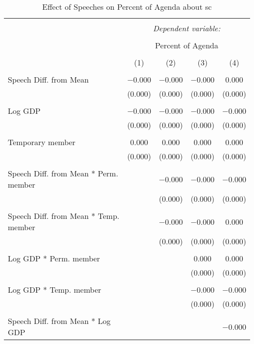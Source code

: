 
\begin{table}[!htbp] \centering 
  \caption{Effect of Speeches on Percent of Agenda about sc} 
  \label{} 
\begin{tabular}{@{\extracolsep{5pt}}lcccc} 
\\[-1.8ex]\hline 
\hline \\[-1.8ex] 
 & \multicolumn{4}{c}{\textit{Dependent variable:}} \\ 
\cline{2-5} 
\\[-1.8ex] & \multicolumn{4}{c}{Percent of Agenda} \\ 
\\[-1.8ex] & (1) & (2) & (3) & (4)\\ 
\hline \\[-1.8ex] 
 Speech Diff. from Mean & $-$0.000 & $-$0.000 & $-$0.000 & 0.000 \\ 
  & (0.000) & (0.000) & (0.000) & (0.000) \\ 
  & & & & \\ 
 Log GDP & $-$0.000 & $-$0.000 & $-$0.000 & $-$0.000 \\ 
  & (0.000) & (0.000) & (0.000) & (0.000) \\ 
  & & & & \\ 
 Temporary member & 0.000 & 0.000 & 0.000 & 0.000 \\ 
  & (0.000) & (0.000) & (0.000) & (0.000) \\ 
  & & & & \\ 
 Speech Diff. from Mean * Perm. member &  & $-$0.000 & $-$0.000 & $-$0.000 \\ 
  &  & (0.000) & (0.000) & (0.000) \\ 
  & & & & \\ 
 Speech Diff. from Mean * Temp. member &  & $-$0.000 & $-$0.000 & 0.000 \\ 
  &  & (0.000) & (0.000) & (0.000) \\ 
  & & & & \\ 
 Log GDP * Perm. member &  &  & 0.000 & 0.000 \\ 
  &  &  & (0.000) & (0.000) \\ 
  & & & & \\ 
 Log GDP * Temp. member &  &  & $-$0.000 & $-$0.000 \\ 
  &  &  & (0.000) & (0.000) \\ 
  & & & & \\ 
 Speech Diff. from Mean * Log GDP &  &  &  & $-$0.000 \\ 

\end{tabular}
\end{table}
